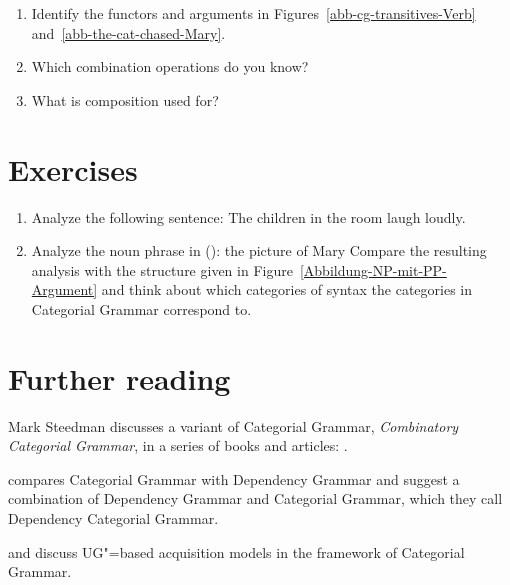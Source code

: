 \begin{enumerate}
\item Identify the functors and arguments in Figures~\ref{abb-cg-transitives-Verb}
  and~\ref{abb-the-cat-chased-Mary}.
\item Which combination operations do you know?
\item What is composition used for?
\end{enumerate}
\pagebreak

\section*{Exercises}

\begin{enumerate}
\item Analyze the following sentence:
\ea
The children in the room laugh loudly.
\z
\item\label{ue-Xbar-CG} Analyze the noun phrase in ():
\ea
the picture of Mary
\z
Compare the resulting analysis with the structure given in Figure~\vref{Abbildung-NP-mit-PP-Argument} and think about which
categories of \xbar syntax the categories in Categorial Grammar correspond to. 
\end{enumerate}

\section*{Further reading}

\begin{sloppypar}
Mark Steedman discusses a variant of Categorial Grammar, \emph{Combinatory Categorial Grammar}, in a series of books and articles:
\citet{Steedman91a,Steedman2000a-u,SB2006a-u}.
\end{sloppypar}
\citet{Lobin2003a} compares Categorial Grammar with Dependency Grammar and \citet{PB93a} suggest a
combination of Dependency Grammar and Categorial Grammar, which they call Dependency Categorial Grammar.

\citet{Briscoe2000a} and \citet{Villavicencio2002a} discuss UG"=based acquisition models in the framework of Categorial Grammar.






